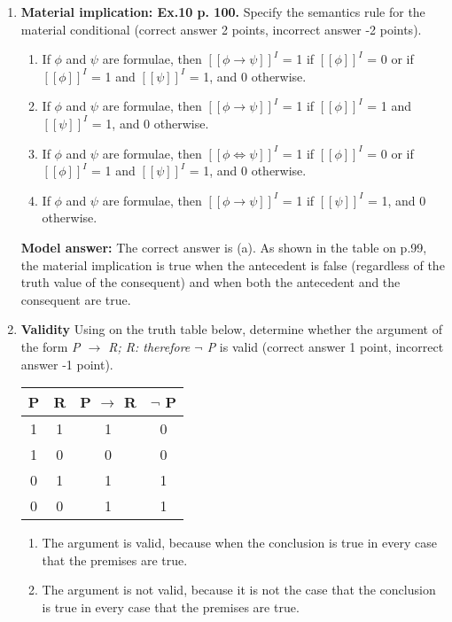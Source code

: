 \documentclass[a4,11pt]{article}
\newcommand{\6}{\mbox{$[\hspace*{-.6mm}[$}}
\newcommand{\9}{\mbox{$]\hspace*{-.6mm}]$}}
\begin{document}
\begin{enumerate}[leftmargin = 12pt]
\item {\bf  Material implication: Ex.10 p. 100.} Specify the semantics rule for the material conditional (correct answer 2 points, incorrect answer -2 points).

\begin{enumerate}
\item If $\phi$ and $\psi$ are formulae, then $[[\phi \to \psi]]^{I}$ = 1 if $[[\phi]]^{I}$ = 0 or if $[[\phi]]^{I}$ = 1 and $[[\psi]]^{I}$ = 1, and 0 otherwise. 
\item If $\phi$ and $\psi$ are formulae, then $[[\phi \to \psi]]^{I}$ = 1 if $[[\phi]]^{I}$ = 1 and $[[\psi]]^{I}$ = 1, and 0 otherwise. 
\item If $\phi$ and $\psi$ are formulae, then $[[\phi \iff \psi]]^{I}$ = 1 if $[[\phi]]^{I}$ = 0 or if $[[\phi]]^{I}$ = 1 and $[[\psi]]^{I}$ = 1, and 0 otherwise. 
\item If $\phi$ and $\psi$ are formulae,  then $[[\phi \to \psi]]^{I}$ = 1 if $[[\psi]]^{I}$ = 1, and 0 otherwise. 
\end{enumerate}

{ \bf Model answer:}  The correct answer is (a). As shown in the table on p.99, the material implication is true when the antecedent is false (regardless of the truth value of the consequent) and when both the antecedent and the consequent are true.

 
\item {\bf Validity} Using on the truth table below, determine whether the argument of the form \textit{ P $\to$ R; R: therefore $\neg$ P} is valid (correct answer 1 point, incorrect answer -1 point).


\begin{tabular}{c | c | c| c }
\hline \hline
P & R & P $\to$ R  & $\neg$ P \\
\hline
1 & 1 & 1 & 0 \\
1 & 0 & 0 & 0 \\
0 & 1 & 1 & 1 \\
0 & 0 & 1 & 1 \\
\hline \hline
\end{tabular}

\begin{enumerate}
\item The argument is valid, because when the conclusion is true in every case that the premises are true.
\item The argument is not valid, because it is not the case that the conclusion is true in every case that the premises are true.
\end{enumerate}


\end{enumerate}
\end{document}
